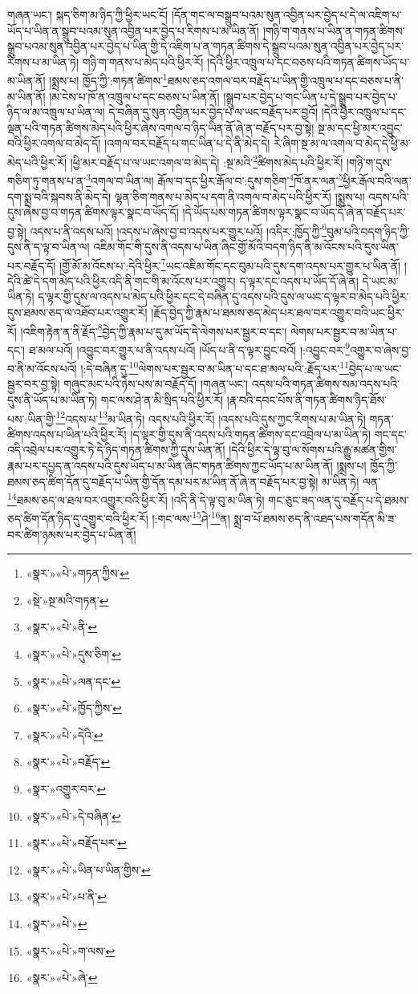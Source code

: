 གཞན་ཡང་། སྐད་ཅིག་མ་ཉིད་ཀྱི་ཕྱིར་ཡང་ངོ། །དོན་གང་ལ་བསྒྲུབ་པའམ་སུན་འབྱིན་པར་བྱེད་པ་དེ་ལ་འཇིག་པ་ཡོད་པ་ཡིན་ན་སྒྲུབ་པའམ་སུན་འབྱིན་པར་བྱེད་པ་རིགས་པ་མ་ཡིན་ནོ། །གཉི་ག་གནས་པ་ཡིན་ན་གཏན་ཚིགས་སྒྲུབ་པའམ་སུན་འབྱིན་པར་བྱེད་པ་ཡིན་གྱི་དེ་འཇིག་པ་ན་གཏན་ཚིགས་དེ་སྒྲུབ་པའམ་སུན་འབྱིན་པར་བྱེད་པར་རིགས་པ་མ་ཡིན་ཏེ། གཉི་ག་གནས་པ་མེད་པའི་ཕྱིར་རོ། །དེའི་ཕྱིར་འཁྲུལ་པ་དང་བཅས་པའི་གཏན་ཚིགས་ཡོད་པ་མ་ཡིན་ནོ། །སྨྲས་པ། ཁྱོད་ཀྱི་:གཏན་ཚིགས་\footnote{«སྣར་»«པེ་»གཏན་ཀྱིས་}ཐམས་ཅད་འགལ་བར་བརྗོད་པ་ཡིན་གྱི་འཁྲུལ་པ་དང་བཅས་པ་ནི་མ་ཡིན་ནོ། །མ་ངེས་པ་ཁོ་ན་འཁྲུལ་པ་དང་བཅས་པ་ཡིན་ནོ། །སྒྲུབ་པར་བྱེད་པ་གང་ཡིན་པ་དེ་སྒྲུབ་པར་བྱེད་པ་ཉིད་ལ་མ་འཁྲུལ་པ་ཡིན་ལ། དེ་བཞིན་དུ་སུན་འབྱིན་པར་བྱེད་པ་ལ་ཡང་བརྗོད་པར་བྱའོ། །དེའི་ཕྱིར་འཁྲུལ་པ་དང་ལྡན་པའི་གཏན་ཚིགས་མེད་པའི་ཕྱིར་ཞེས་འགལ་བ་ཉིད་ཡིན་ནོ་ཞེ་ན་བརྗོད་པར་བྱ་སྟེ། སྔ་མ་དང་ཕྱི་མར་འབྱུང་བའི་ཕྱིར་འགལ་བ་མེད་དོ། །འགལ་བར་བརྗོད་པ་གང་ཡིན་པ་དེ་ནི་མེད་དེ། རེ་ཞིག་སྔ་མ་ལ་འགལ་བ་མེད་དེ་ཕྱི་མ་མེད་པའི་ཕྱིར་རོ། །ཕྱི་མར་བརྗོད་པ་ལ་ཡང་འགལ་བ་མེད་དེ། :སྔ་མའི་\footnote{«སྡེ་»སྔ་མའི་གཏན་}ཚིགས་མེད་པའི་ཕྱིར་རོ། །གཉི་ག་དུས་གཅིག་ཏུ་གནས་པ་ན་\footnote{«སྣར་»«པེ་»ནི་}འགལ་བ་ཡིན་ལ། རྒོལ་བ་དང་ཕྱིར་རྒོལ་བ་:དུས་གཅིག་\footnote{«སྣར་»«པེ་»དུས་ཅིག་}ཁོ་ནར་ལན་\footnote{«སྣར་»«པེ་»ལན་དང་}ཕྱིར་རྒོལ་བའི་ལན་དག་སྨྲ་བའི་སྐབས་ནི་མེད་དེ། ལྷན་ཅིག་གནས་པ་མེད་པ་དག་ནི་འགལ་བ་མེད་པའི་ཕྱིར་རོ། །སྨྲས་པ། འདས་པའི་དུས་ཞེས་བྱ་བ་གཏན་ཚིགས་ལྟར་སྣང་བ་ཡོད་དོ། །དེ་ཡོད་པས་གཏན་ཚིགས་ལྟར་སྣང་བ་ཡོད་དོ་ཞེ་ན་བརྗོད་པར་བྱ་སྟེ། འདས་པ་ནི་འདས་པའོ། །འདས་པ་ཞེས་བྱ་བ་འདས་པར་གྱུར་པའོ། །འདིར་:ཁྱོད་ཀྱི་\footnote{«སྣར་»«པེ་»ཁྱོད་ཀྱིས་}བུམ་པའི་བདག་ཉིད་ཀྱི་དུས་ནི་ད་ལྟ་བ་ཡིན་ལ། འཇིམ་གོང་གི་དུས་ནི་འདས་པ་ཡིན་ཞིང་གྱོ་མོའི་བདག་ཉིད་ནི་མ་འོངས་པའི་དུས་ཡིན་པར་བརྗོད་དོ། །གྱོ་མོ་མ་འོངས་པ་:དེའི་ཕྱིར་\footnote{«སྣར་»«པེ་»དེའི་}ཡང་འཇིམ་གོང་དང་བུམ་པའི་དུས་དག་འདས་པར་གྱུར་པ་ཡིན་ནོ། །དེའི་ཚེ་དེ་དག་མེད་པའི་ཕྱིར་འདི་ནི་གང་གི་མ་འོངས་པར་འགྱུར། ད་ལྟར་དང་འདས་པ་ཡོད་དོ་ཞེ་ན། དེ་ཡང་མ་ཡིན་ཏེ། ད་ལྟར་གྱི་དུས་ལ་འདས་པ་མེད་པའི་ཕྱིར་དང་དེ་བཞིན་དུ་འདས་པའི་དུས་ལ་ཡང་ད་ལྟར་བ་མེད་པའི་ཕྱིར་དུས་ཐམས་ཅད་ལ་འཐོབ་པར་འགྱུར་རོ། །རྗོད་བྱེད་ཀྱི་རྣམ་པ་ཐམས་ཅད་མེད་པར་ཐལ་བར་འགྱུར་བའི་ཡང་ཕྱིར་རོ། །འཇིག་རྟེན་ན་ནི་རྗོད་\footnote{«སྣར་»«པེ་»བརྗོད་}བྱེད་ཀྱི་རྣམ་པ་དུ་མ་ཡོད་དེ་ལེགས་པར་སྦྱར་བ་དང་། ལེགས་པར་སྦྱར་བ་མ་ཡིན་པ་དང་། ཐ་མལ་པའོ། །འབྱུང་བར་གྱུར་པ་ནི་འདས་པའོ། །ཡོད་པ་ནི་ད་ལྟར་བྱུང་བའོ། །:འབྱུང་བར་\footnote{«སྣར་»འགྱུར་བར་}འགྱུར་བ་ཞེས་བྱ་བ་ནི་མ་འོངས་པའོ། །:དེ་བཞིན་དུ་\footnote{«སྣར་»«པེ་»དེ་བཞིན་}ལེགས་པར་སྦྱར་བ་མ་ཡིན་པ་དང་ཐ་མལ་པའི་:རྗོད་པར་\footnote{«སྣར་»«པེ་»བརྗོད་པར་}བྱེད་པ་ལ་ཡང་སྦྱར་བར་བྱ་སྟེ། གཞུང་མང་པའི་ཉེས་པས་མ་བརྗོད་དོ། །གཞན་ཡང་། འདས་པའི་གཏན་ཚིགས་སམ་འདས་པའི་དུས་ནི་ཡོད་པ་མ་ཡིན་ཏེ། གང་ལས་ཤེ་ན་མི་སྲིད་པའི་ཕྱིར་རོ། །རྣ་བའི་དབང་པོས་ནི་གཏན་ཚིགས་ཉིད་ཐོས་པས་:ཡིན་གྱི་\footnote{«སྣར་»«པེ་»ཡིན་པ་ཡིན་གྱིས་}འདས་པ་\footnote{«སྣར་»«པེ་»པ་ནི་}མ་ཡིན་ཏེ། འདས་པའི་ཕྱིར་རོ། །འདས་པའི་དུས་ཀྱང་རིགས་པ་མ་ཡིན་ཏེ། གཏན་ཚིགས་འདས་པ་ཡིན་པའི་ཕྱིར་རོ། །ད་ལྟར་གྱི་དུས་ནི་འདས་པའི་གཏན་ཚིགས་དང་འབྲེལ་པ་མ་ཡིན་ཏེ། གང་དང་འདི་འབྲེལ་པར་འགྱུར་ཏེ་དེ་ཉིད་གཏན་ཚིགས་ཀྱི་དུས་ཡིན་ནོ། །དེའི་ཕྱིར་དེ་ལྟ་བུ་ལ་སོགས་པའི་རྒྱུ་མཚན་གྱིས་རྣམ་པར་དཔྱད་ན་འདས་པའི་དུས་ཡོད་པ་མ་ཡིན་ཞིང་གཏན་ཚིགས་ཀྱང་ཡོད་པ་མ་ཡིན་ནོ། །སྨྲས་པ། ཁྱོད་ཀྱི་ཐམས་ཅད་ཚིག་དོན་དུ་བརྗོད་པ་ཡིན་གྱི་དོན་དམ་པར་མ་ཡིན་ནོ་ཞེ་ན་བརྗོད་པར་བྱ་སྟེ། མ་ཡིན་ཏེ། ལན་\footnote{«སྣར་»«པེ་»}ཐམས་ཅད་ལ་ཐལ་བར་འགྱུར་བའི་ཕྱིར་རོ། །འདི་ནི་དེ་ལྟ་བུ་མ་ཡིན་ཏེ། གང་ཅུང་ཟད་ལན་དུ་བརྗོད་པ་དེ་ཐམས་ཅད་ཚིག་དོན་ཉིད་དུ་འགྱུར་བའི་ཕྱིར་རོ། །:གང་ལས་\footnote{«སྣར་»«པེ་»ག་ལས་}ཤེ་\footnote{«སྣར་»«པེ་»ཞེ་}ན། སྨྲ་བ་པོ་ཐམས་ཅད་ནི་འཐད་པས་གདོན་མི་ཟ་བར་ཚིག་ཉམས་པར་བྱེད་པ་ཡིན་ནོ། 